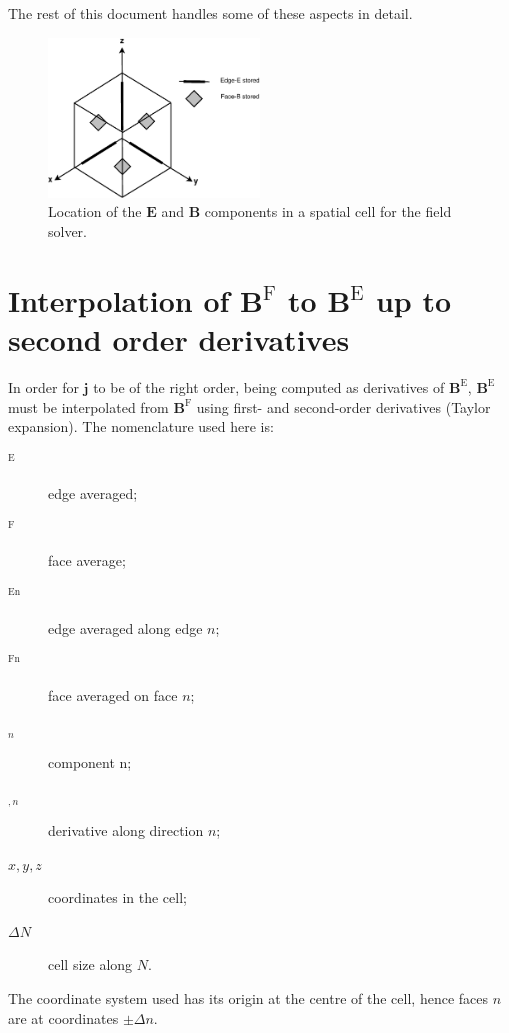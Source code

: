 \documentclass[a4paper,10pt]{article}
\newcommand{\E}{\mathbf{E}}
\newcommand{\B}{\mathbf{B}}
\newcommand{\Be}{\mathbf{B}^\mathrm{E}}
\newcommand{\Bf}{\mathbf{B}^{\mathrm{F}}}
\newcommand{\J}{\mathbf{j}}
\begin{document}
The rest of this document handles some of these aspects in detail.


\begin{figure}
   \centering
   \includegraphics[width=0.5\textwidth]{variables.eps}
   \caption{Location of the $\E$ and $\B$ components in a spatial cell for the
field solver.}
\label{fig:Components}
\end{figure}




\section{Interpolation of $\Bf$ to $\Be$ up to second order derivatives}
In order for $\J$ to be of the right order, being computed as derivatives of
$\Be$, $\Be$ must be interpolated from $\Bf$ using first- and second-order
derivatives (Taylor expansion). The nomenclature used here is:
\begin{description}
   \item[$^\mathrm{E}$] edge averaged;
   \item[$^\mathrm{F}$] face average;
   \item[$^\mathrm{En}$] edge averaged along edge $n$;
   \item[$^\mathrm{Fn}$] face averaged on face $n$;
   \item[$_n$] component n;
   \item[$_{,n}$] derivative along direction $n$;
   \item[$x,y,z$] coordinates in the cell;
   \item[$\Delta N$] cell size along $N$.
\end{description}
The coordinate system used has its origin at the centre of the cell, hence
faces $n$ are at coordinates $\pm\Delta n$.
\end{document}
